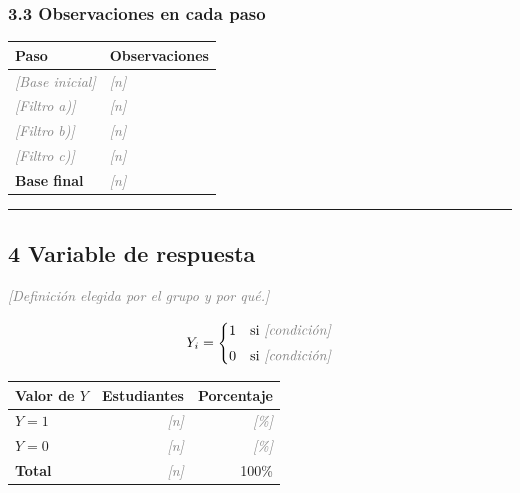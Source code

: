 \documentclass[11pt,letterpaper]{article}
\newcommand{\completar}[1]{\textcolor{gray}{\textit{[#1]}}}
\begin{document}
\subsubsection*{3.3 \; Observaciones en cada paso}

\begin{center}
\begin{tabular}{>{\raggedright\arraybackslash}p{9cm}
                >{\raggedleft\arraybackslash}p{3cm}}
\toprule
\textbf{Paso} & \textbf{Observaciones} \\
\midrule
\completar{Base inicial} & \completar{n} \\
\completar{Filtro a)} & \completar{n} \\
\completar{Filtro b)} & \completar{n} \\
\completar{Filtro c)} & \completar{n} \\
\rowcolor{yellow!30}
\textbf{Base final} & \completar{n} \\
\bottomrule
\end{tabular}
\end{center}

\medskip\hrule\medskip

\subsection*{4 \; Variable de respuesta}

\completar{Definición elegida por el grupo y por qué.}

\[
Y_i =
\begin{cases}
1 & \text{si } \completar{condición} \\[4pt]
0 & \text{si } \completar{condición}
\end{cases}
\]

\begin{center}
\begin{tabular}{lrr}
\toprule
\textbf{Valor de $Y$} & \textbf{Estudiantes} & \textbf{Porcentaje} \\
\midrule
$Y = 1$ & \completar{n} & \completar{\%} \\
$Y = 0$ & \completar{n} & \completar{\%} \\
\midrule
\textbf{Total} & \completar{n} & 100\% \\
\bottomrule
\end{tabular}
\end{center}
\end{document}
